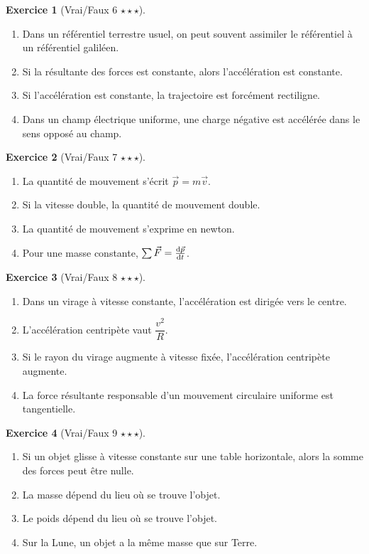 \documentclass[11pt,a4paper]{article}
\theoremstyle{definition}
\newtheorem{exercice}{Exercice}[section]
\newcommand{\etoiles}[1]{\hfill{\small\textbf{#1}}}
\begin{document}
\begin{exercice}[Vrai/Faux 6 \etoiles{$\star\star\star$}]
\begin{enumerate}[label=\alph*)]
    \item Dans un référentiel terrestre usuel, on peut souvent assimiler le référentiel à un référentiel galiléen.
    \item Si la résultante des forces est constante, alors l’accélération est constante.
    \item Si l’accélération est constante, la trajectoire est forcément rectiligne.
    \item Dans un champ électrique uniforme, une charge négative est accélérée dans le sens opposé au champ.
\end{enumerate}
\end{exercice}

\begin{exercice}[Vrai/Faux 7 \etoiles{$\star\star\star$}]
\begin{enumerate}[label=\alph*)]
    \item La quantité de mouvement s’écrit $\vec{p}=m\vec{v}$.
    \item Si la vitesse double, la quantité de mouvement double.
    \item La quantité de mouvement s’exprime en newton.
    \item Pour une masse constante, $\sum \vec{F}=\dv{\vec{p}}{t}$.
\end{enumerate}
\end{exercice}

\begin{exercice}[Vrai/Faux 8 \etoiles{$\star\star\star$}]
\begin{enumerate}[label=\alph*)]
    \item Dans un virage à vitesse constante, l’accélération est dirigée vers le centre.
    \item L’accélération centripète vaut $\dfrac{v^2}{R}$.
    \item Si le rayon du virage augmente à vitesse fixée, l’accélération centripète augmente.
    \item La force résultante responsable d’un mouvement circulaire uniforme est tangentielle.
\end{enumerate}
\end{exercice}

\begin{exercice}[Vrai/Faux 9 \etoiles{$\star\star\star$}]
\begin{enumerate}[label=\alph*)]
    \item Si un objet glisse à vitesse constante sur une table horizontale, alors la somme des forces peut être nulle.
    \item La masse dépend du lieu où se trouve l’objet.
    \item Le poids dépend du lieu où se trouve l’objet.
    \item Sur la Lune, un objet a la même masse que sur Terre.
\end{enumerate}
\end{exercice}
\end{document}

